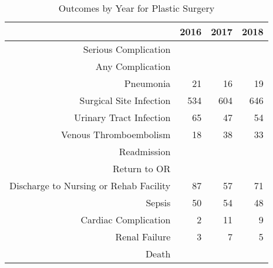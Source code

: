 \begin{table}[ht]
\centering
\begin{tabular}{rrrr}
  \hline
 & 2016 & 2017 & 2018 \\ 
  \hline
Serious Complication &  &  &  \\ 
  Any Complication &  &  &  \\ 
  Pneumonia &  21 &  16 &  19 \\ 
  Surgical Site Infection & 534 & 604 & 646 \\ 
  Urinary Tract Infection &  65 &  47 &  54 \\ 
  Venous Thromboembolism &  18 &  38 &  33 \\ 
  Readmission &  &  &  \\ 
  Return to OR &  &  &  \\ 
  Discharge to Nursing or Rehab Facility &  87 &  57 &  71 \\ 
  Sepsis &  50 &  54 &  48 \\ 
  Cardiac Complication &   2 &  11 &   9 \\ 
  Renal Failure &   3 &   7 &   5 \\ 
  Death &  &  &  \\ 
   \hline
\end{tabular}
\caption{Outcomes by Year for Plastic Surgery} 
\end{table}
